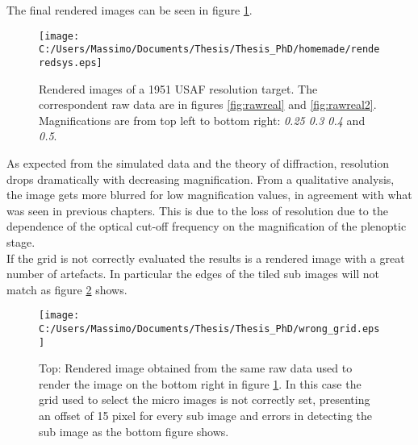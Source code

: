 The final rendered images can be seen in figure \ref{fig:renderingreal1}.
\\
\begin{figure}[H]
	\centering
	\texttt{[image: C:/Users/Massimo/Documents/Thesis/Thesis\_PhD/homemade/renderedsys.eps]}
	\caption{\label{fig:renderingreal1}Rendered images of a 1951 USAF resolution target. The correspondent raw data are in figures \ref{fig:rawreal} and \ref{fig:rawreal2}. Magnifications are from top left to bottom right: \textit{0.25 0.3 0.4} and \textit{0.5}. }
\end{figure}
As expected from the simulated data and the theory of diffraction, resolution drops dramatically with decreasing magnification. From a qualitative analysis, the image gets more blurred for low magnification values, in agreement with what was seen in previous chapters. This is due to the loss of resolution due to the dependence of the optical cut-off frequency on the magnification of the plenoptic stage.\\
If the grid is not correctly evaluated the results is a rendered image with a great number of artefacts. In particular the edges of the tiled sub images will not match as figure \ref{fig:renderinwrong1} shows.
\begin{figure}[H]
	\centering
	\texttt{[image: C:/Users/Massimo/Documents/Thesis/Thesis\_PhD/wrong\_grid.eps]}
	\caption{\label{fig:renderinwrong1} Top: Rendered image obtained from the same raw data used to render the image on the bottom right in figure \ref{fig:renderingreal1}. In this case the grid used to select the micro images is not correctly set, presenting an offset of 15 pixel for every sub image and errors in detecting the sub image as the bottom figure shows.}
\end{figure}
